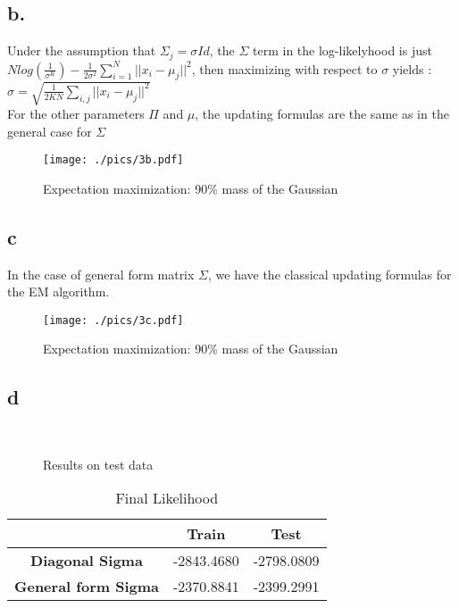 \documentclass[12pt]{article}
\begin{document}
\subsection*{b.}
Under the assumption that $\Sigma_{j} = \sigma Id$, the $\Sigma$ term in the log-likelyhood is just ~\\
$N log(\frac{1}{\sigma^{K}})-\frac{1}{2\sigma^{2}} \sum \limits_{i=1}^N ||x_{i}-\mu_{j}||^{2}$, then maximizing with respect to $\sigma$ yields :~\\
$\sigma=\sqrt{\frac{1}{2KN}\sum \limits_{i,j} ||x_{i}-\mu_{j}||^2}$~\\
For the other parameters $\Pi$ and $\mu$, the updating formulas are the same as in the general case for $\Sigma$
\begin{figure}[h!]
	\centering 
	\texttt{[image: ./pics/3b.pdf]}
	\caption{Expectation maximization: 90\% mass of the Gaussian}
	\label{fig:3b}
\end{figure}

\subsection*{c}
In the case of general form matrix $\Sigma$, we have the classical updating formulas for the EM algorithm.
\begin{figure}[h!]
	\centering 
	\texttt{[image: ./pics/3c.pdf]}
	\caption{Expectation maximization: 90\% mass of the Gaussian}
	\label{fig:3c}
\end{figure}

\subsection*{d}
\begin{figure} [H]
\centering
   \\
  \caption{Results on test data} 
  \label{fig:3d}
\end{figure}

\begin{table}[H]
\centering
	\begin{tabular}{c|c|c|} 
	\cline{2-3}
	& \multicolumn{1}{c|}{\cellcolor[gray]{0.7} \textbf{Train}}  
	& \multicolumn{1}{c|}{\cellcolor[gray]{0.7} \textbf{Test}}
	\\ \hline
	
	\multicolumn{1}{|c|}{\cellcolor[gray]{0.8} \textbf{Diagonal Sigma}}   & -2843.4680 & -2798.0809 \\ \hline
	\multicolumn{1}{|c|}{\cellcolor[gray]{0.8} \textbf{General form Sigma}}   & -2370.8841
	 & -2399.2991 \\ \hline
	
	\end{tabular} 
	\caption{Final Likelihood}
	\label{tab:Likelihood}
\end{table}
\end{document}
